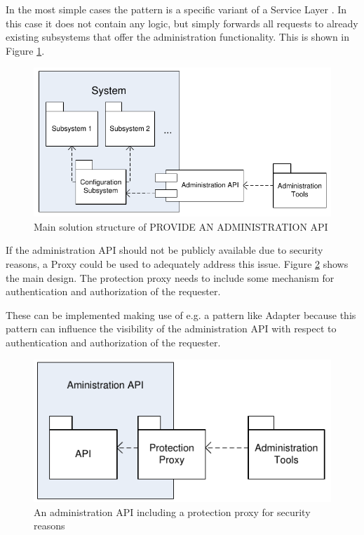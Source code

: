 In the most simple cases the pattern is a specific variant of a {\sc Service Layer} \cite{Fowler:2002:PEA:579257}. In this case it does not contain any logic, but simply forwards all requests to already existing subsystems that offer the administration functionality. This is shown in Figure \ref{fig:provideAPIDiagram-01}.  

\begin{figure}[h]
\centering
\includegraphics{patterns/provideAPIDiagram-01.pdf}
\caption{Main solution structure of PROVIDE AN ADMINISTRATION API}
\label{fig:provideAPIDiagram-01}
\end{figure}

If the administration API should not be publicly available due to security reasons, a {\sc Proxy} \cite{Buschmann1996} could be used to adequately address this issue. Figure \ref{fig:provideAPIDiagram-02} shows the main design. The protection proxy needs to include some mechanism for authentication and authorization of the requester.

These can be implemented making use of e.g. a pattern like {\sc Adapter} \cite{Gamma95} because this pattern can influence the visibility of the administration API with respect to authentication and authorization of the requester.

\begin{figure}[h]
\centering
\includegraphics{patterns/provideAPIDiagram-02.pdf}
\caption{An administration API including a protection proxy for security reasons}
\label{fig:provideAPIDiagram-02}
\end{figure}

